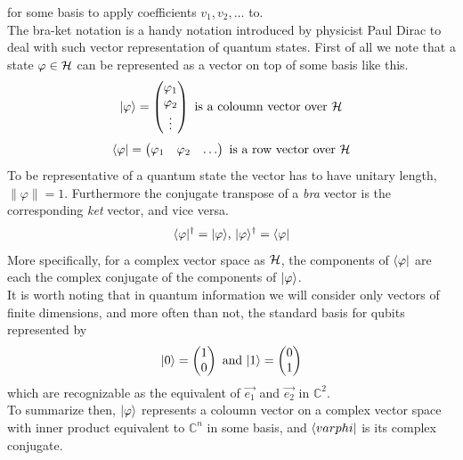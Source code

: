 	for some basis to apply coefficients $v_1, v_2, \ldots$ to.\\
	The bra-ket notation is a handy notation introduced by physicist Paul Dirac to deal with such vector representation of quantum states. First of all we note that a state $\varphi\in\mathcal{H}$ can be represented as a vector on top of some basis like this.
	$$|\varphi \rangle = \begin{pmatrix} \varphi_1 \\ \varphi_2 \\ \vdots \end{pmatrix}	  \text{  is a coloumn vector over } \mathcal{H} $$
	$$\langle \varphi|  = \begin{pmatrix} \varphi_1 & \varphi_2 & \hdots \end{pmatrix} \text{  is a row vector over } \mathcal{H} $$
	To be representative of a quantum state the vector has to have unitary length, $\|\varphi\|= 1$.
	Furthermore the conjugate transpose of a \emph{bra} vector is the corresponding \emph{ket} vector, and vice versa.
	$$ \langle \varphi|^{\dagger} = |\varphi \rangle \text{,    } |\varphi \rangle^{\dagger} = \langle \varphi|$$
	More specifically, for a complex vector space as $\mathcal{H}$, the components of $\langle \varphi|$ are each the complex conjugate of the components of $|\varphi \rangle$.\\
	It is worth noting that in quantum information we will consider only vectors of finite dimensions, and more often than not, the standard basis for qubits represented by
	$$|0 \rangle =  \begin{pmatrix} 1 \\ 0 \end{pmatrix}
	\text{ and }
	|1 \rangle =  \begin{pmatrix} 0 \\ 1 \end{pmatrix}$$
	which are recognizable as the equivalent of $\vec{e_1}$ and $\vec{e_2}$ in $\mathbb{C}^2$.\\
	
	To summarize then, $|\varphi \rangle$ represents a coloumn vector on a complex vector space with inner product equivalent to $\mathbb{C}^n$ in some basis, and $\langle varphi|$ is its complex conjugate.
	
	

